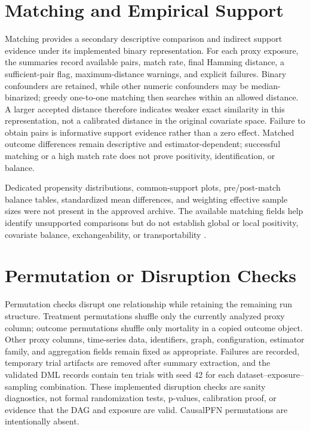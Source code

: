 \endgroup

\section{Matching and Empirical Support}
\label{sec:robustness-sensitivity-validation-design:overlap-support-diagnostics}

Matching provides a secondary descriptive comparison and indirect support evidence under its implemented binary representation.  For each proxy exposure, the summaries record available pairs, match rate, final Hamming distance, a sufficient-pair flag, maximum-distance warnings, and explicit failures.  Binary confounders are retained, while other numeric confounders may be median-binarized; greedy one-to-one matching then searches within an allowed distance.  A larger accepted distance therefore indicates weaker exact similarity in this representation, not a calibrated distance in the original covariate space.  Failure to obtain pairs is informative support evidence rather than a zero effect.  Matched outcome differences remain descriptive and estimator-dependent; successful matching or a high match rate does not prove positivity, identification, or balance.

Dedicated propensity distributions, common-support plots, pre/post-match balance tables, standardized mean differences, and weighting effective sample sizes were not present in the approved archive.  The available matching fields help identify unsupported comparisons but do not establish global or local positivity, covariate balance, exchangeability, or transportability \cite{crump_et_al_2009_limited_overlap}.

\section{Permutation or Disruption Checks}
\label{sec:robustness-sensitivity-validation-design:permutation-checks-reproducibility-validation}

Permutation checks disrupt one relationship while retaining the remaining run structure.  Treatment permutations shuffle only the currently analyzed proxy column; outcome permutations shuffle only mortality in a copied outcome object.  Other proxy columns, time-series data, identifiers, graph, configuration, estimator family, and aggregation fields remain fixed as appropriate.  Failures are recorded, temporary trial artifacts are removed after summary extraction, and the validated DML records contain ten trials with seed 42 for each dataset--exposure--sampling combination.  These implemented disruption checks are sanity diagnostics, not formal randomization tests, p-values, calibration proof, or evidence that the DAG and exposure are valid.  CausalPFN permutations are intentionally absent.

